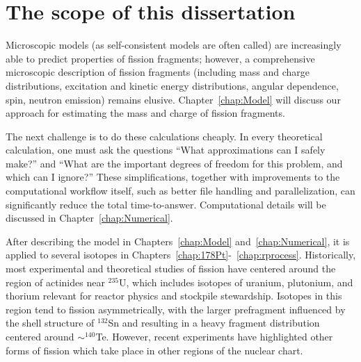\section{The scope of this dissertation}
Microscopic models (as self-consistent models are often called) are increasingly able to predict properties of fission fragments; however, a comprehensive microscopic description of fission fragments (including mass and charge distributions, excitation and kinetic energy distributions, angular dependence, spin, neutron emission) remains elusive. Chapter~\ref{chap:Model} will discuss our approach for estimating the mass and charge of fission fragments.


The next challenge is to do these calculations cheaply. In every theoretical calculation, one must ask the questions ``What approximations can I safely make?'' and ``What are the important degrees of freedom for this problem, and which can I ignore?'' These simplifications, together with improvements to the computational workflow itself, such as better file handling and parallelization, can significantly reduce the total time-to-answer. Computational details will be discussed in Chapter~\ref{chap:Numerical}.

After describing the model in Chapters~\ref{chap:Model} and~\ref{chap:Numerical}, it is applied to several isotopes in Chapters~\ref{chap:178Pt}-~\ref{chap:rprocess}. Historically, most experimental and theoretical studies of fission have centered around the region of actinides near $^{235}$U, which includes isotopes of uranium, plutonium, and thorium relevant for reactor physics and stockpile stewardship. Isotopes in this region tend to fission asymmetrically, with the larger prefragment influenced by the shell structure of $^{132}$Sn and resulting in a heavy fragment distribution centered around ${\sim}^{140}$Te. However, recent experiments have highlighted other forms of fission which take place in other regions of the nuclear chart.%

